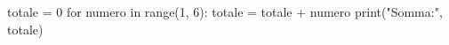 \begin{unipdcode}[language=Python]
totale = 0
for numero in range(1, 6):
    totale = totale + numero
print("Somma:", totale)
\end{unipdcode}
